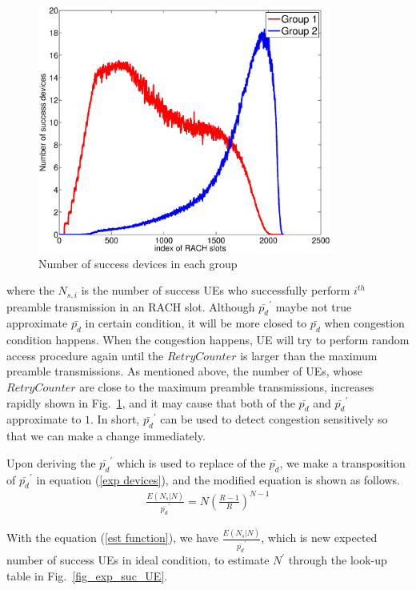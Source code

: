     \begin{figure}[t]
    \centering
    \includegraphics[width=3.8in]{fig_propose_suc_gorup.eps}
    \caption{Number of success devices in each group}
    \label{fig_propose_suc_group}
    \end{figure}
     where the $N_{s,i}$ is the number of success UEs who successfully perform $i^{th}$ preamble transmission in an RACH slot. Although $\bar{p_{d}}^\prime$ maybe not true approximate $\bar{p_d}$ in certain condition, it will be more closed to $\bar{p_d}$ when congestion condition happens. When the congestion happens, UE will try to perform random access procedure again until the $RetryCounter$ is larger than the maximum preamble transmissions. As mentioned above, the number of UEs, whose $RetryCounter$ are close to the maximum preamble transmissions, increases rapidly shown in Fig.~\ref{fig_propose_suc_group}, and it may cause that both of the $\bar{p_d}$ and $\bar{p_d}^\prime$ approximate to $1$. In short, $\bar{p_d}^\prime$ can be used to detect congestion sensitively so that we can make a change immediately.

     Upon deriving the $\bar{p_d}^\prime$ which is used to replace of the $\bar{p_d}$, we make a transposition of $\bar{p_d}^\prime$ in equation (\ref{exp devices}), and the modified equation is shown as follows.
     \begin{align}
     \label{est function}
         \frac{E{(N_s|N)}}{\bar{p_{d}}^\prime} = N (\frac{R-1}{R})^{N-1}
     \end{align}

     With the equation (\ref{est function}), we have $\frac{E{(N_s|N)}}{\bar{p_{d}}^\prime}$, which is new expected number of success UEs in ideal condition, to estimate $N^\prime$ through the look-up table in Fig.~\ref{fig_exp_suc_UE}.

